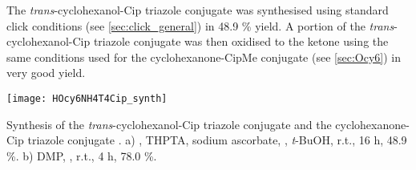 The \textit{trans}-cyclohexanol-Cip triazole conjugate  was synthesised using standard click conditions (see \ref{sec:click_general}) in 48.9 \% yield.
A portion of the \textit{trans}-cyclohexanol-Cip triazole conjugate  was then oxidised to the ketone using the same conditions used for the cyclohexanone-CipMe conjugate (see \ref{sec:Ocy6}) in very good yield.

\begin{scheme}[H]
	\begin{center}
		\texttt{[image: HOcy6NH4T4Cip\_synth]}
		\caption{Synthesis of the \textit{trans}-cyclohexanol-Cip triazole conjugate  and the cyclohexanone-Cip triazole conjugate . 
		a) , THPTA, sodium ascorbate, , \textit{t}-BuOH, r.t., 16 h, 48.9 \%. 
		b) DMP, , r.t., 4 h, 78.0 \%.
		\label{sch:HOcy6NH4T4Cip_synth}}
	\end{center}
\end{scheme}